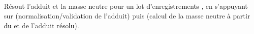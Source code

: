 \documentclass[letterpaper,10pt,english]{sphinxmanual}
\begin{document}
\subsection{}
\label{\detokenize{1_Integration:adducts-records}}
\sphinxAtStartPar
Résout l’adduit et la masse neutre pour un lot d’enregistrements
, en s’appuyant sur
{\hyperref[\detokenize{api:utils.neutral_mass.adduct}]{}} (normalisation/validation de l’adduit) puis
{\hyperref[\detokenize{api:utils.neutral_mass.neutral_mass}]{}} (calcul de la masse neutre à partir du
 et de l’adduit résolu).
\end{document}
